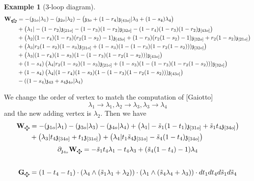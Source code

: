 \documentclass[11pt]{amsart}
\newcommand{\bgraphW}{
  \mathbf{W}_{\tikz[baseline=-0.5ex]{
      \coordinate (A) at (0,0);
      \coordinate (B) at (2mm,0);
      \coordinate (C) at (2.5mm,1mm);
      \coordinate (D) at (1.25mm,2mm);
      \coordinate (E) at (-0.5mm,1mm);

      \fill (A) circle (0.25mm);
      \fill (B) circle (0.25mm);
      \fill (C) circle (0.25mm);
      \fill (D) circle (0.25mm);
      \fill (E) circle (0.25mm);

      \draw (A) -- (B);
      \draw (B) -- (C);
      \draw (C) -- (D);
      \draw (D) -- (E);
      \draw (E) -- (A);

      \draw (E) -- (A);
      \draw (E) -- (B);
      \draw (E) -- (C);
      \draw (E) -- (D);
  }}
}
\newcommand{\agraphG}{
  \mathbf{G}_{\tikz[baseline=-0.5ex]{
      \coordinate (A) at (0,0);
      \coordinate (B) at (2mm,0);
      \coordinate (C) at (1mm,1mm);
      \coordinate (D) at (1mm,-1mm);

      \fill (A) circle (0.25mm);
      \fill (B) circle (0.25mm);
      \fill (C) circle (0.25mm);
      \fill (D) circle (0.25mm);

      \draw (A) -- (C);
      \draw (A) -- (D);
      \draw (C) -- (D);
      \draw (B) -- (C);
      \draw (B) -- (D);
  }}
}
\newcommand{\agraphW}{
  \mathbf{W}_{\tikz[baseline=-0.5ex]{
      \coordinate (A) at (0,0);
      \coordinate (B) at (2mm,0);
      \coordinate (C) at (1mm,1mm);
      \coordinate (D) at (1mm,-1mm);

      \fill (A) circle (0.25mm);
      \fill (B) circle (0.25mm);
      \fill (C) circle (0.25mm);
      \fill (D) circle (0.25mm);

      \draw (A) -- (C);
      \draw (A) -- (D);
      \draw (C) -- (D);
      \draw (B) -- (C);
      \draw (B) -- (D);
  }}
}
\theoremstyle{definition}
\newtheorem{exa}[thm]{Example}
\theoremstyle{remark}
\numberwithin{equation}{section}
\begin{document}
\begin{exa}[3-loop diagram]
\iffalse
  \begin{align*}
        \bgraphW&=-(\mathfrak{z}_{1o}|\lambda_1)-(\mathfrak{z}_{2o}|\lambda_2)-\left(\mathfrak{z}_{3o}+(1-r_4)\mathfrak{z}_{[43o]}|\lambda_{3}+(1-s_4)\lambda_4\right)\\
        &+\left(\lambda_1|-(1-r_{2})\mathfrak{z}_{[2 1o]}-(1-r_3)(1-r_2)\mathfrak{z}_{[32o]}-(1-r_4)(1-r_3)(1-r_2)\mathfrak{z}_{[43o]}\right)\\
&+\left(\lambda_2|(1-r_4)(1-r_{3})(r_2(1-s_2)-1)\mathfrak{z}_{[43o]}+(1-r_{3})(r_2(1-s_2)-1)\mathfrak{z}_{[3 2o]}+r_2(1-s_2)\mathfrak{z}_{[2 1o]}\right)\\
&+\left(\lambda_3|r_2(1-s_2)(1-s_3)\mathfrak{z}_{[21o]}+(1-s_3)(1-(1-r_3)(1-r_2(1-s_2)))\mathfrak{z}_{[32o]}\right)\\
&+\left(\lambda_3|(1-r_4)(1-s_3)(1-(1-r_3)(1-r_2(1-s_2)))\mathfrak{z}_{[43o]}\right)\\
&+(1-s_4)\left(\lambda_4|r_2(1-s_2)(1-s_3)\mathfrak{z}_{[21o]}+(1-s_3)(1-(1-r_3)(1-r_2(1-s_2)))\mathfrak{z}_{[32o]}\right)\\
&+(1-s_4)\left(\lambda_4|(1-r_4)(1-s_3)(1-(1-r_3)(1-r_2(1-s_2)))\mathfrak{z}_{[43o]}\right)\\
&-\left((1-s_4)\mathfrak{z}_{43}+s_4\mathfrak{z}_{4o}|\lambda_4\right)
  \end{align*}

  We change the order of vertex to match the computation of [Gaiotto]
  $$
  \lambda_1\rightarrow\lambda_1,\lambda_2\rightarrow \lambda_3, \lambda_3\rightarrow \lambda_4
  $$
  and the new adding vertex is $\lambda_2$. Then we have
  \begin{align*}
      \agraphW &=-(\mathfrak{z}_{1o}|\lambda_1)-(\mathfrak{z}_{3o}|\lambda_3)-\left(\mathfrak{z}_{4o}|\lambda_{4}\right)+\left(\lambda_1|-\tilde{s}_1(1-t_1)\mathfrak{z}_{[3 1o]}+\tilde{s}_1t_4\mathfrak{z}_{[34o]}\right)\\
&+\left(\lambda_3|t_4\mathfrak{z}_{[34o]}+t_1\mathfrak{z}_{[3 1o]}\right)+\left(\lambda_4|t_1\tilde{s}_4\mathfrak{z}_{[31o]}-\tilde{s}_4(1-t_4)\mathfrak{z}_{[34o]}\right)\\
\end{align*}
$$
\partial_{\mathfrak{z}_{4o}}\agraphW=-\tilde{s}_1t_4\lambda_1-t_4\lambda_3+(\tilde{s}_4(1-t_4)-1)\lambda
_4
$$
  \begin{align*}
     &  \\
     \agraphG& =(1-t_4-t_1)\cdot(\lambda_4\wedge(\tilde{s}_1\lambda_1+\lambda_2))\cdot (\lambda_1\wedge(\tilde{s}_4\lambda_4+\lambda_3)) \cdot dt_1dt_4d\tilde{s}_1d\tilde{s}_4
  \end{align*}


\end{exa}
\end{document}
